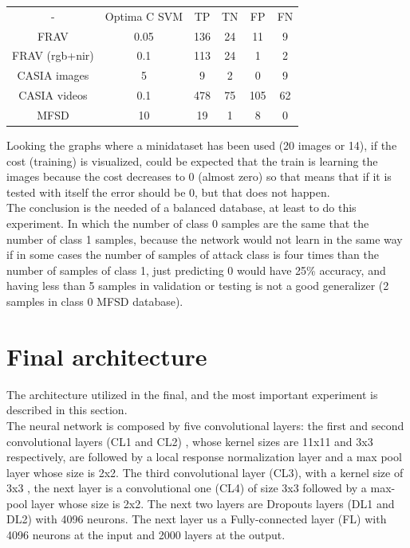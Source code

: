 \begin{table}[htb]
\centering
\label{table-ej1}
\begin{tabular}{cccccc}
-              &Optima C SVM& TP & TN & FP & FN \\
FRAV           &    0.05   & 136& 24 &  11 & 9 \\
FRAV (rgb+nir) &    0.1    & 113& 24 &  1  & 2 \\
CASIA images   &    5      & 9  & 2  &  0  & 9 \\
CASIA videos   &    0.1    & 478& 75 &  105& 62 \\
MFSD           &    10     & 19 &  1 &   8 & 0 \\
\end{tabular}
\end{table}

Looking the graphs where a minidataset has been used (20 images or 14), if the cost (training) is visualized, could be expected that the train is learning the images because the cost decreases to 0 (almost zero) so that means that if it is tested with itself the error should be 0, but that does not happen.\\

The conclusion is the needed of a balanced database, at least to do this experiment. In which the number of class 0 samples are the same that the number of class 1 samples, because the network would not learn in the same way if in some cases the number of samples of  attack class is four times than the number of samples of class 1, just predicting 0 would have 25\% accuracy, and having less than 5 samples in validation or testing is not a good generalizer (2 samples in class 0 MFSD database).\\

\section{Final architecture}\label{Final_archi} %
The architecture utilized in the final, and the most important experiment is described in this section.\\

The neural network is composed by five convolutional layers: the first and second convolutional layers (CL1 and CL2) , whose kernel sizes are 11x11 and 3x3 respectively, are followed by a local response normalization layer and a max pool layer whose size is 2x2. The third convolutional layer (CL3), with a kernel size of 3x3 , the next layer is a convolutional one (CL4) of size 3x3 followed by a max-pool layer whose size is 2x2. The next two layers are Dropouts layers (DL1 and DL2) with 4096 neurons. The next layer us a Fully-connected layer (FL) with 4096 neurons at the input and 2000 layers at the output.\\

